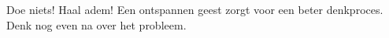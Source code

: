 Doe niets! Haal adem! Een ontspannen geest zorgt voor een beter denkproces. Denk nog even na over het probleem.

